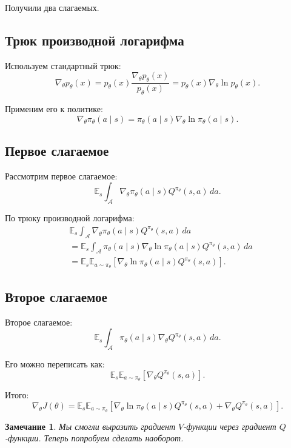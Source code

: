 \documentclass[12pt,a4paper]{article}
\newtheorem{remark}{Замечание}
\begin{document}
Получили два слагаемых.

\subsection{Трюк производной логарифма}

Используем стандартный трюк:
\[
\nabla_\theta p_\theta(x)
=
p_\theta(x)
\frac{\nabla_\theta p_\theta(x)}
{p_\theta(x)}
=
p_\theta(x)
\nabla_\theta \ln p_\theta(x).
\]

Применим его к политике:
\[
\nabla_\theta \pi_\theta(a\mid s)
=
\pi_\theta(a\mid s)
\nabla_\theta
\ln \pi_\theta(a\mid s).
\]

\subsection{Первое слагаемое}

Рассмотрим первое слагаемое:
\[
\mathbb E_s
\int_{\mathcal A}
\nabla_\theta \pi_\theta(a\mid s)
Q^{\pi_\theta}(s,a)
\,da.
\]

По трюку производной логарифма:
\[
\begin{aligned}
&
\mathbb E_s
\int_{\mathcal A}
\nabla_\theta \pi_\theta(a\mid s)
Q^{\pi_\theta}(s,a)
\,da
\\
&=
\mathbb E_s
\int_{\mathcal A}
\pi_\theta(a\mid s)
\nabla_\theta
\ln \pi_\theta(a\mid s)
Q^{\pi_\theta}(s,a)
\,da
\\
&=
\mathbb E_s
\mathbb E_{a\sim\pi_\theta}
\left[
\nabla_\theta
\ln \pi_\theta(a\mid s)
Q^{\pi_\theta}(s,a)
\right].
\end{aligned}
\]

\subsection{Второе слагаемое}

Второе слагаемое:
\[
\mathbb E_s
\int_{\mathcal A}
\pi_\theta(a\mid s)
\nabla_\theta Q^{\pi_\theta}(s,a)
\,da.
\]

Его можно переписать как:
\[
\mathbb E_s
\mathbb E_{a\sim\pi_\theta}
\left[
\nabla_\theta Q^{\pi_\theta}(s,a)
\right].
\]

Итого:
\[
\nabla_\theta J(\theta)
=
\mathbb E_s
\mathbb E_{a\sim\pi_\theta}
\left[
\nabla_\theta
\ln \pi_\theta(a\mid s)
Q^{\pi_\theta}(s,a)
+
\nabla_\theta Q^{\pi_\theta}(s,a)
\right].
\]

\begin{remark}
Мы смогли выразить градиент $V$-функции через градиент $Q$-функции. Теперь попробуем сделать наоборот.
\end{remark}
\end{document}
